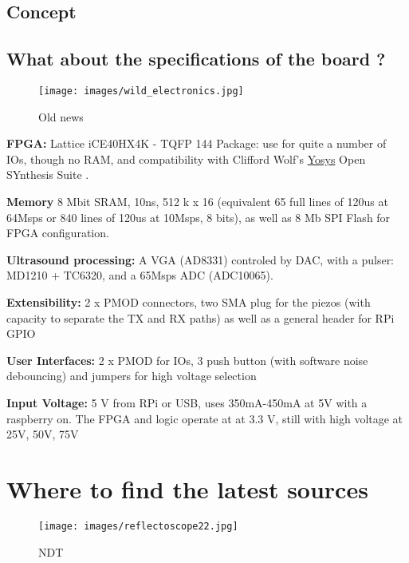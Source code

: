 \documentclass{article}
\begin{document}
\subsection{Concept}
 


\subsection{What about the specifications of the board ?}

\begin{wrapfigure}{l}{0.21\textwidth}
  \vspace{-10pt}
  \begin{center}
    \texttt{[image: images/wild\_electronics.jpg]}
  \end{center}
    \vspace{-13pt}
  \caption{Old news}
  \vspace{-35pt}
\end{wrapfigure}

\textbf{FPGA:} Lattice iCE40HX4K - TQFP 144 Package: use for quite a number of IOs, though no RAM, and compatibility with Clifford Wolf's \href{http://www.clifford.at/yosys/}{Yosys} Open SYnthesis Suite \cite{yosys}. 

\textbf{Memory}    8 Mbit SRAM, 10ns, 512 k x 16 (equivalent 65 full lines of 120us at 64Msps or 840 lines of 120us at 10Msps, 8 bits), as well as 8 Mb SPI Flash for FPGA configuration.

\textbf{Ultrasound processing: } A VGA (AD8331) controled by DAC, with a pulser: MD1210 + TC6320, and a 65Msps ADC (ADC10065).
        
\textbf{Extensibility:} 2 x PMOD connectors, two SMA plug for the piezos (with capacity to separate the TX and RX paths) as well as a general header for RPi GPIO

\textbf{User Interfaces:} 2 x PMOD for IOs, 3 push button (with software noise debouncing) and jumpers for high voltage selection

\textbf{Input Voltage: }5 V from RPi or USB, uses 350mA-450mA at 5V with a raspberry on. The FPGA and logic operate at at 3.3 V, still with high voltage at 25V, 50V, 75V

\section{Where to find the latest sources} 

\begin{wrapfigure}{r}{0.16\textwidth}
  \vspace{-20pt}
  \begin{center}
    \texttt{[image: images/reflectoscope22.jpg]}
  \end{center}
    \vspace{-13pt}
  \caption{NDT}
  \vspace{-55pt}
\end{wrapfigure}
\end{document}
